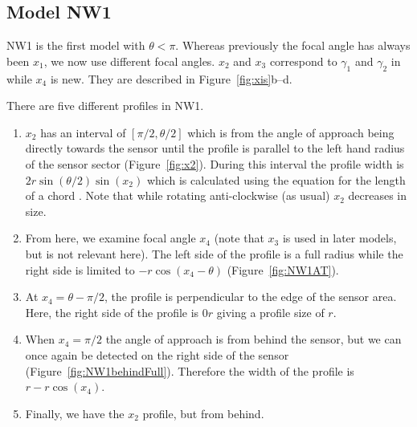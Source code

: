 \subsection{Model NW1} \label{NW1}

NW1 is the first model with $\theta < \pi$.
Whereas previously the focal angle has always been $x_1$, we now use different focal angles.
$x_2$ and $x_3$ correspond to $\gamma_1$ and $\gamma_2$ in \cite{rowcliffe2008estimating} while $x_4$ is new.
They are described in Figure~\ref{fig:xis}b--d.

There are five different profiles in NW1.
\begin{enumerate}
\item $x_2$ has an interval of $[\pi/2, \theta/2]$ which is from the angle of approach being directly towards the sensor until the profile is parallel to the left hand radius of the sensor sector (Figure~\ref{fig:x2}).
During this interval the profile width is $2r\sin\left(\theta/2\right)\sin(x_2)$ which is calculated using the equation for the length of a chord .
Note that while rotating anti-clockwise (as usual) $x_2$ decreases in size.
\item From here, we examine focal angle $x_4$ (note that $x_3$ is used in later models, but is not relevant here).  The left side of the profile is a full radius while the right side is limited to $- r\cos(x_4 - \theta)$ (Figure~\ref{fig:NW1AT}).
\item At $x_4 =  \theta - \pi/2$, the profile is perpendicular to the edge of the sensor area.
Here, the right side of the profile is $0r$ giving a profile size of $r$.
\item When $x_4 = \pi/2$ the angle of approach is from behind the sensor, but we can once again be detected on the right side of the sensor (Figure~\ref{fig:NW1behindFull}).
Therefore the width of the profile is $r - r\cos(x_4)$.
\item  Finally, we have the $x_2$ profile, but from behind.
\end{enumerate}





